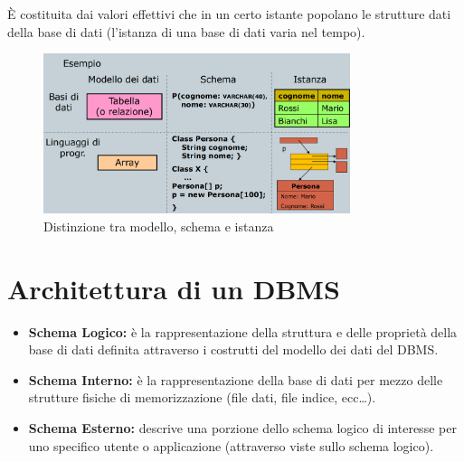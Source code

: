 \documentclass[a4paper, 12pt]{book}
\begin{document}
    \vspace{15pt}

    \begin{tcolorbox}[
      colback=cyan!5!white,
      colframe=blue!50!black,
      title=\textbf{Definizione - Istanza di una base di dati},
      coltitle=white,
      fonttitle=\bfseries,
      arc=3mm,
      boxrule=0.5pt,
      enhanced,
      breakable
    ]
    È costituita dai valori effettivi che in un certo istante popolano le strutture dati della base di dati (l’istanza di una base di dati varia nel tempo).

    \end{tcolorbox}

    \vspace{15pt}



    \begin{figure}[h]
        \centering
        \includegraphics[width=0.8\textwidth]{images/modelloSchemaIstanza.png}
        \caption{Distinzione tra modello, schema e istanza}
    \end{figure}



    \section*{Architettura di un DBMS}

    \begin{itemize}
      \item \textbf{Schema Logico:} è la rappresentazione della struttura e delle proprietà della base di dati definita attraverso i costrutti del modello dei dati del DBMS.
      \item \textbf{Schema Interno:} è la rappresentazione della base di dati per mezzo delle strutture fisiche di memorizzazione (file dati, file indice, ecc…).
      \item \textbf{Schema Esterno:} descrive una porzione dello schema logico di interesse per uno specifico utente o applicazione (attraverso viste sullo schema logico).\\
    \end{itemize}
  
\end{document}
